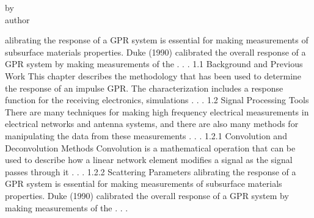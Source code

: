 \documentclass[12pt]{mines-thesis}
\begin{document}

\newpage
{}  

\clearpage
\vspace*{\fill}
\begin{center}
	\begin{minipage}{\textwidth}
\end{minipage}
\end{center}
\vspace{\fill}
\begin{center}
	by\\
	author
\end{center}
\clearpage
alibrating the response of a GPR system is essential for making measurements of subsurface materials properties. Duke (1990) calibrated the overall response of a GPR system by making measurements of the . . .
1.1 Background and Previous Work
This chapter describes the methodology that has been used to determine the response of an impulse GPR. The characterization includes a response function for the receiving electronics, simulations . . .
1.2 Signal Processing Tools
There are many techniques for making high frequency electrical measurements in electrical networks and antenna systems, and there are also many methods for manipulating the data from these measurements . . .
1.2.1 Convolution and Deconvolution Methods
Convolution is a mathematical operation that can be used to describe how a linear network element modifies a signal as the signal passes through it . . .
1.2.2 Scattering Parameters
\newpage
alibrating the response of a GPR system is essential for making measurements of subsurface materials properties. Duke (1990) calibrated the overall response of a GPR system by making measurements of the . . .
\end{document}
